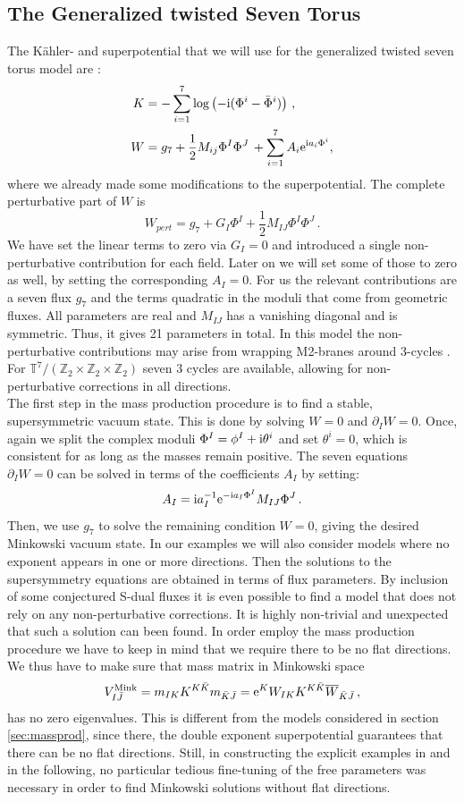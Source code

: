 \documentclass[12pt]{report}
\newcommand{\be}{\begin{equation}}
\newcommand{\ee}{\end{equation}}
\newcommand{\bea}{\begin{equation}\begin{aligned}}
\newcommand{\eea}{\end{aligned}\end{equation}}
\def\rmi{{\rm i}}
\def\rme{{\rm e}}
\begin{document}
\subsection{The Generalized twisted Seven Torus}
The Kähler- and superpotential that we will use for the generalized twisted seven torus model are \cite{DallAgata:2005zlf,Derendinger:2014wwa}:
\bea 
\label{eq:mtheorypots}
K &= - \sum_{i=1}^7 \log \left( -\rmi (\Phi^i - \bar{\Phi}^i)\right)\,,\\
W &=  g_7 + \frac{1}{2} M_{ij} \Phi^I \Phi^J\, + \sum_{i=1}^7 A_i \rme ^{\rmi a_i \Phi^i},
\eea
where we already made some modifications to the superpotential. The complete perturbative part of $W$ is 
\be
W_{pert} =  g_7 + G_I \Phi^I + \frac{1}{2} M_{IJ} \Phi^I \Phi^J\,.
\ee
We have set the linear terms to zero via $G_I =0$ and introduced a single non-perturbative contribution for each field. Later on we will set some of those to zero as well, by setting the corresponding $A_I=0$. For us the relevant contributions are a seven flux $g_7$ and the terms quadratic in the moduli that come from geometric fluxes. All parameters are real and $M_{IJ}$ has a vanishing diagonal and is symmetric. Thus, it gives 21 parameters in total. In this model the non-perturbative contributions may arise from wrapping M2-branes around 3-cycles \cite{Harvey:1999as}. For $\mathbb{T} ^7/(\mathbb{Z}_2 \times \mathbb{Z}_2 \times \mathbb{Z}_2)$ seven 3 cycles are available, allowing for non-perturbative corrections in all directions.\\
The first step in the mass production procedure is to find a stable, supersymmetric vacuum state. This is done by solving $W = 0$ and $\partial_I W = 0$. Once, again we split the complex moduli $\Phi^I = \phi^I + \rmi \theta^i$ and set $\theta^i=0$, which is consistent for as long as the masses remain positive. The seven equations $\partial_I W =0$ can be solved in terms of the coefficients $A_I$ by setting:
\be 
A_I = \rmi a^{-1}_I \rme^{-\rmi a_I \Phi^I} M_{IJ} \Phi^J\,.
\ee
Then, we use $g_7$ to solve the remaining condition $W=0$, giving the desired Minkowski vacuum state. In our examples we will also consider models where no exponent appears in one or more directions. Then the solutions to the supersymmetry equations are obtained in terms of flux parameters. By inclusion of some conjectured S-dual fluxes it is even possible to find a model that does not rely on any non-perturbative corrections. It is highly non-trivial and unexpected that such a solution can been found. In order employ the mass production procedure we have to keep in mind that we require there to be no flat directions. We thus have to make sure that mass matrix in Minkowski space
\be 
V_{I\bar{J}}^{\text{Mink}} = m_{IK} K^{K\bar{K}} m_{\bar{K}\bar{J}} = \rme^K W_{IK} K^{K\bar{K}} \overline{W}_{\bar{K}\bar{J}}\,,
\ee
has no zero eigenvalues. This is different from the models considered in section \ref{sec:massprod}, since there, the double exponent superpotential guarantees that there can be no flat directions. Still, in constructing the explicit examples in \cite{Cribiori:2019hrb} and in the following, no particular tedious fine-tuning of the free parameters was necessary in order to find Minkowski solutions without flat directions.\\
\end{document}
